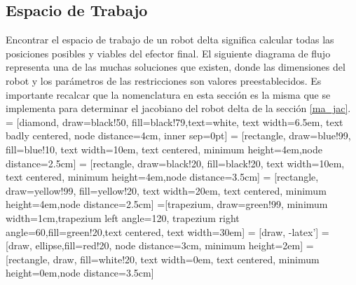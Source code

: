         \newpage

        \newpage

        
    \subsection{Espacio de Trabajo}\label{espaciotrabajows1}
     Encontrar el espacio de trabajo de un robot delta significa calcular todas las posiciones posibles y viables del efector final. El siguiente diagrama de flujo representa una de las muchas soluciones que existen, donde las dimensiones del robot y los parámetros de las restricciones son valores preestablecidos. Es importante recalcar que la nomenclatura en esta sección es la misma que se implementa para determinar el jacobiano del robot delta de la sección \ref{ma_jac}. 
 = [diamond, draw=black!50, fill=black!79,text=white, 
    text width=6.5em, text badly centered, node distance=4cm, inner sep=0pt]
 = [rectangle, draw=blue!99, fill=blue!10, 
    text width=10em, text centered,   minimum height=4em,node distance=2.5cm]
 = [rectangle, draw=black!20, fill=black!20, 
    text width=10em, text centered,   minimum height=4em,node distance=3.5cm]
 = [rectangle, draw=yellow!99, fill=yellow!20, 
    text width=20em, text centered,   minimum height=4em,node distance=2.5cm]
=[trapezium, draw=green!99, minimum width=1cm,trapezium left angle=120, trapezium right angle=60,fill=green!20,text centered, text width=30em]
 = [draw, -latex']
 = [draw, ellipse,fill=red!20, node distance=3cm, minimum height=2em]
 = [rectangle, draw, fill=white!20, 
    text width=0em, text centered,   minimum height=0em,node distance=3.5cm]
